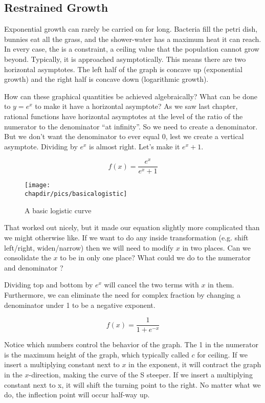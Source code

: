 
\subsection{Restrained Growth}



Exponential growth can rarely be carried on for long.  Bacteria fill the petri dish, 
bunnies eat all the grass, and the shower-water has a maximum heat it can 
reach.  In every case, the is a constraint, a ceiling value that the population 
cannot grow beyond.  Typically, it is approached asymptotically.  This means there are
two horizontal asymptotes.  The left half of the graph is concave up (exponential
growth) and the right half is concave down (logarithmic growth).  

How can these graphical quantities be achieved algebraically?  What can 
be done to $y=e^x$ to make it have a horizontal asymptote?  As we saw last
chapter, rational functions have horizontal asymptotes at the level of the ratio
of the numerator to the denominator ``at infinity''.  So we need to create a 
denominator.  But we don't want the denominator to ever equal 0, lest we
create a vertical asymptote.  Dividing by $e^x$ is almost right.  Let's make it
$e^x+1$.

$$
f(x) = \frac{e^x}{e^x+1}
$$

\begin{figure}[h]
\begin{centering}
\texttt{[image: \\chapdir/pics/basicalogistic]}
\caption{A basic logistic curve}
\end{centering}
\end{figure}

That worked out nicely, but it made our equation slightly more complicated
than we might otherwise like.  If we want to do any inside transformation (e.g.
shift left/right, widen/narrow) then we will need to modify $x$ in two places.  Can
we consolidate the $x$ to be in only one place?  What could we do to the
numerator and denominator ?

Dividing top and bottom by $e^x$ will cancel the two terms with $x$ in them.
Furthermore, we can eliminate the need for complex fraction by changing
a denominator under 1 to be a negative exponent.

$$
f(x) = \frac{1}{1+e^{-x}}
$$

Notice which numbers control the behavior of the graph.  The 1 in the numerator
is the maximum height of the graph, which typically called $c$ for ceiling. If we
insert a multiplying constant next to $x$ in the exponent, it will contract the
graph in the $x$-direction, making the curve of the S steeper.  If we insert
a multiplying constant next to x, it will shift the turning point to the right.  No
matter what we do, the inflection point will occur half-way up.

